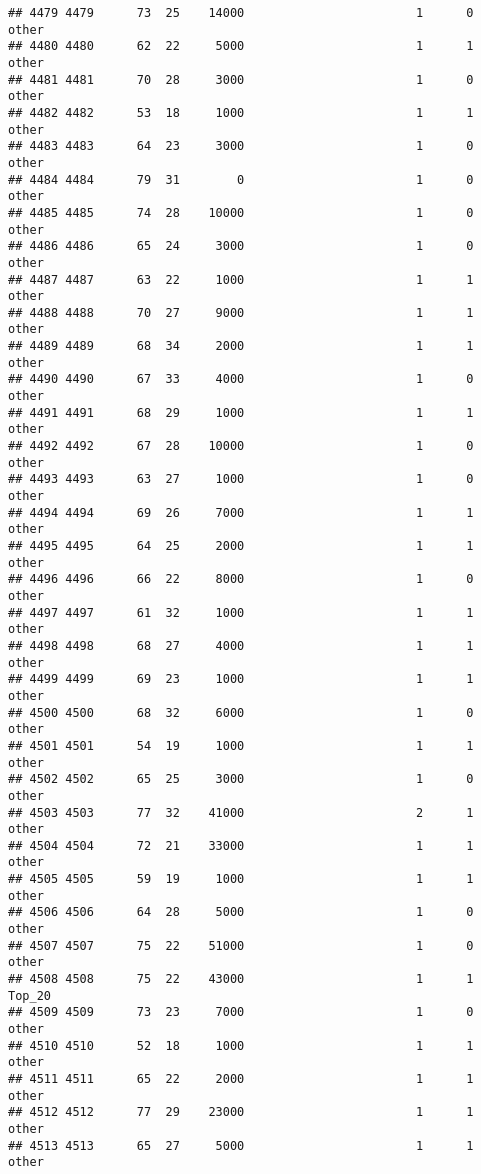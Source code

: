 \documentclass[
]{article}
\begin{document}
\begin{verbatim}
## 4479 4479      73  25    14000                        1      0    other
## 4480 4480      62  22     5000                        1      1    other
## 4481 4481      70  28     3000                        1      0    other
## 4482 4482      53  18     1000                        1      1    other
## 4483 4483      64  23     3000                        1      0    other
## 4484 4484      79  31        0                        1      0    other
## 4485 4485      74  28    10000                        1      0    other
## 4486 4486      65  24     3000                        1      0    other
## 4487 4487      63  22     1000                        1      1    other
## 4488 4488      70  27     9000                        1      1    other
## 4489 4489      68  34     2000                        1      1    other
## 4490 4490      67  33     4000                        1      0    other
## 4491 4491      68  29     1000                        1      1    other
## 4492 4492      67  28    10000                        1      0    other
## 4493 4493      63  27     1000                        1      0    other
## 4494 4494      69  26     7000                        1      1    other
## 4495 4495      64  25     2000                        1      1    other
## 4496 4496      66  22     8000                        1      0    other
## 4497 4497      61  32     1000                        1      1    other
## 4498 4498      68  27     4000                        1      1    other
## 4499 4499      69  23     1000                        1      1    other
## 4500 4500      68  32     6000                        1      0    other
## 4501 4501      54  19     1000                        1      1    other
## 4502 4502      65  25     3000                        1      0    other
## 4503 4503      77  32    41000                        2      1    other
## 4504 4504      72  21    33000                        1      1    other
## 4505 4505      59  19     1000                        1      1    other
## 4506 4506      64  28     5000                        1      0    other
## 4507 4507      75  22    51000                        1      0    other
## 4508 4508      75  22    43000                        1      1   Top_20
## 4509 4509      73  23     7000                        1      0    other
## 4510 4510      52  18     1000                        1      1    other
## 4511 4511      65  22     2000                        1      1    other
## 4512 4512      77  29    23000                        1      1    other
## 4513 4513      65  27     5000                        1      1    other

\end{verbatim}
\end{document}
